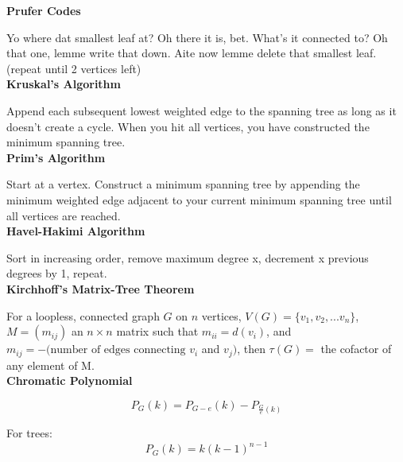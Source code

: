 
\textbf{Prufer Codes}

    Yo where dat smallest leaf at? Oh there it is, bet. What’s it connected to? Oh that one, lemme 
    write that down. Aite now lemme delete that smallest leaf. (repeat until 2 vertices left)\\

\textbf{Kruskal's Algorithm}

    Append each subsequent lowest weighted edge to the spanning tree as long as it doesn't create a cycle. When you hit all vertices, you have constructed the minimum spanning tree.\\

\textbf{Prim's Algorithm}

    Start at a vertex. Construct a minimum spanning tree by appending the minimum weighted edge adjacent to your current minimum spanning tree until all vertices are reached.\\


\textbf{Havel-Hakimi Algorithm}

    Sort in increasing order, remove maximum degree x, decrement x previous degrees by 1, repeat.\\

\textbf{Kirchhoff's Matrix-Tree Theorem}

    For a loopless, connected graph $G$ on $n$ vertices, $V(G)=\{v_1, v_2, ... v_n\}$, $M=(m_{ij})$ an $n \times n$ matrix such that $m_{ii}=d(v_i)$, and $m_{ij}=-(\text{number of edges connecting } v_i $ and $v_j)$, then $\tau(G)=$ the cofactor of any element of M.\\

\textbf{Chromatic Polynomial}

    \[P_G(k) = P_{G-e}(k)-P_{\frac{G}{e}(k)}\]

    For trees: \[P_G(k) = k(k-1)^{n-1}\]

